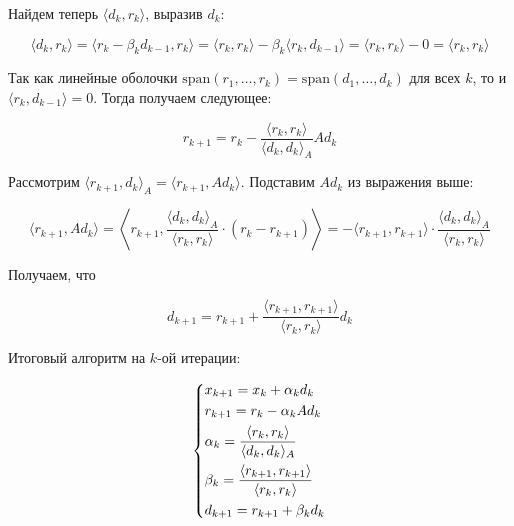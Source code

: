 Найдем теперь $\langle d_k, r_k \rangle$, выразив $d_k$:

\[
\langle d_k, r_k \rangle = \langle r_k - \beta_k d_{k-1}, r_k \rangle = \langle r_k, r_k \rangle - \beta_k \langle r_k, d_{k-1} \rangle = \langle r_k, r_k \rangle - 0 = \langle r_k, r_k \rangle
\]

Так как линейные оболочки $\mathrm{span}(r_1, \ldots, r_k) = \mathrm{span}(d_1, \ldots, d_k)$ для всех $k$, то и $\langle r_k, d_{k-1} \rangle = 0$. Тогда получаем следующее:

\[
r_{k+1} = r_k - \frac{\langle r_k, r_k \rangle}{\langle d_k, d_k \rangle_A} A d_k
\]

Рассмотрим $\langle r_{k+1}, d_k \rangle_A = \langle r_{k+1}, A d_k \rangle$. Подставим $A d_k$ из выражения выше:

\[
\langle r_{k+1}, A d_k \rangle =
%
\left\langle
r_{k+1}, \frac{\langle d_k, d_k \rangle_A}{\langle r_k, r_k \rangle} \cdot (r_k - r_{k+1})
\right\rangle =
-\langle r_{k+1}, r_{k+1} \rangle \cdot  \frac{\langle d_k, d_k \rangle_A}{\langle r_k, r_k \rangle}
\]

Получаем, что

\[
d_{k+1} = r_{k+1} + \frac{\langle r_{k+1}, r_{k+1} \rangle}{\langle r_k, r_k \rangle} d_k
\]

Итоговый алгоритм на $k$-ой итерации:

\begin{equation*}
    \begin{dcases*}
        x_{k+1} = x_k + \alpha_k d_k\\
        r_{k+1} = r_k - \alpha_k A d_k\\
        \alpha_k = \frac{\langle r_k, r_k \rangle}{\langle d_k, d_k \rangle_A}\\
        \beta_k = \frac{\langle r_{k+1}, r_{k+1} \rangle}{\langle r_k, r_k \rangle}\\
        d_{k+1} = r_{k+1} + \beta_k d_k
    \end{dcases*}
\end{equation*}
